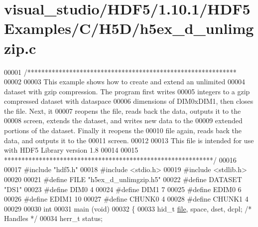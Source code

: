 \hypertarget{visual__studio_2_h_d_f5_21_810_81_2_h_d_f5_examples_2_c_2_h5_d_2h5ex__d__unlimgzip_8c_source}{}\section{visual\+\_\+studio/\+H\+D\+F5/1.10.1/\+H\+D\+F5\+Examples/\+C/\+H5\+D/h5ex\+\_\+d\+\_\+unlimgzip.c}
\label{visual__studio_2_h_d_f5_21_810_81_2_h_d_f5_examples_2_c_2_h5_d_2h5ex__d__unlimgzip_8c_source}

\begin{DoxyCode}
00001 \textcolor{comment}{/************************************************************}
00002 \textcolor{comment}{}
00003 \textcolor{comment}{  This example shows how to create and extend an unlimited}
00004 \textcolor{comment}{  dataset with gzip compression.  The program first writes}
00005 \textcolor{comment}{  integers to a gzip compressed dataset with dataspace}
00006 \textcolor{comment}{  dimensions of DIM0xDIM1, then closes the file.  Next, it}
00007 \textcolor{comment}{  reopens the file, reads back the data, outputs it to the}
00008 \textcolor{comment}{  screen, extends the dataset, and writes new data to the}
00009 \textcolor{comment}{  extended portions of the dataset.  Finally it reopens the}
00010 \textcolor{comment}{  file again, reads back the data, and outputs it to the}
00011 \textcolor{comment}{  screen.}
00012 \textcolor{comment}{}
00013 \textcolor{comment}{  This file is intended for use with HDF5 Library version 1.8}
00014 \textcolor{comment}{}
00015 \textcolor{comment}{ ************************************************************/}
00016 
00017 \textcolor{preprocessor}{#include "hdf5.h"}
00018 \textcolor{preprocessor}{#include <stdio.h>}
00019 \textcolor{preprocessor}{#include <stdlib.h>}
00020 
00021 \textcolor{preprocessor}{#define FILE            "h5ex\_d\_unlimgzip.h5"}
00022 \textcolor{preprocessor}{#define DATASET         "DS1"}
00023 \textcolor{preprocessor}{#define DIM0            4}
00024 \textcolor{preprocessor}{#define DIM1            7}
00025 \textcolor{preprocessor}{#define EDIM0           6}
00026 \textcolor{preprocessor}{#define EDIM1           10}
00027 \textcolor{preprocessor}{#define CHUNK0          4}
00028 \textcolor{preprocessor}{#define CHUNK1          4}
00029 
00030 \textcolor{keywordtype}{int}
00031 main (\textcolor{keywordtype}{void})
00032 \{
00033     hid\_t           \hyperlink{structfile}{file}, space, dset, dcpl;    \textcolor{comment}{/* Handles */}
00034     herr\_t          status;

\end{DoxyCode}
